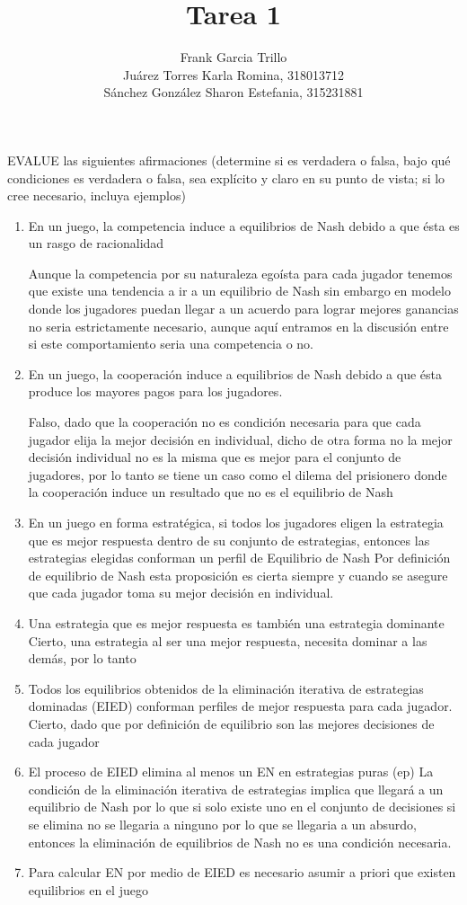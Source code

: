 \documentclass{homework}
\author{Frank Garcia Trillo\\
Juárez Torres Karla Romina,   318013712\\
Sánchez González Sharon Estefania, 315231881}
\title{Tarea 1}
\begin{document}
 \maketitle


\question EVALUE las siguientes afirmaciones (determine si es verdadera o falsa, bajo qué condiciones es verdadera o falsa, sea explícito y claro en su punto de vista; si lo cree necesario, incluya ejemplos)

\begin{enumerate}
        \item En un juego, la competencia induce a equilibrios de Nash debido a que ésta es un rasgo
de racionalidad
    
        Aunque la competencia por su naturaleza egoísta para cada jugador tenemos que existe una tendencia a ir a un equilibrio de Nash sin embargo en modelo donde los jugadores puedan llegar a un acuerdo para lograr mejores ganancias no seria estrictamente necesario, aunque aquí entramos en la discusión entre si este comportamiento seria una competencia o no.
    \item En un juego, la cooperación induce a equilibrios de Nash debido a que ésta produce los mayores pagos para los jugadores.
        
        Falso, dado que la cooperación no es condición necesaria para que cada jugador elija la mejor decisión en individual, dicho de otra forma no la mejor decisión individual no es la misma que es mejor para el conjunto de jugadores, por lo tanto se tiene un caso como el dilema del prisionero donde la cooperación induce un resultado que no es el equilibrio de Nash
    \item En un juego en forma estratégica, si todos los jugadores eligen la estrategia que es mejor respuesta dentro de su conjunto de estrategias, entonces las estrategias elegidas conforman un perfil de Equilibrio de Nash
        Por definición de equilibrio de Nash esta proposición es cierta siempre y cuando se asegure que cada jugador toma su mejor decisión en individual.
    \item Una estrategia que es mejor respuesta es también una estrategia dominante
        Cierto, una estrategia al ser una mejor respuesta, necesita dominar a las demás, por lo tanto 
    \item Todos los equilibrios obtenidos de la eliminación iterativa de estrategias dominadas (EIED) conforman perfiles de mejor respuesta para cada jugador.
        Cierto, dado que por definición de equilibrio son las mejores decisiones de cada jugador
    \item El proceso de EIED elimina al menos un EN en estrategias puras (ep)
        La condición de la eliminación iterativa de estrategias implica que llegará a un equilibrio de Nash por lo que si solo existe uno en el conjunto de decisiones si se elimina no se llegaria a ninguno por lo que se llegaria a un absurdo, entonces la eliminación de equilibrios de Nash no es una condición necesaria.
    \item Para calcular EN por medio de EIED es necesario asumir a priori que existen equilibrios en el juego
        

\end{enumerate}
\end{document}
